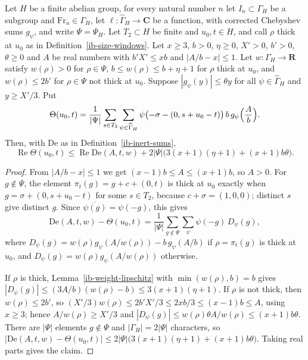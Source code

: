 \begin{lemma}\label{ib-thick-replacement}
Let $H$ be a finite abelian group, for every natural number $n$ let
$I_n\subset\Gamma_H$ be a subgroup and $\mathrm{Fr}_n\in\Gamma_H$, let
$\ell:\widehat\Gamma_H\to\mathbf C$ be a function, with corrected Chebyshev sums $g_\psi$,
and write $\Psi=\Psi_H$. Let $T_2\subset H$ be finite and $u_0,t\in H$, and call
$\rho$ thick at $u_0$ as in Definition~\ref{ib-size-windows}. Let
$x\geq3$, $b>0$, $\eta\geq0$, $X'>0$, $b'>0$, $\theta\geq0$ and $A$ be real
numbers with $b'X'\leq xb$ and $|A/b-x|\leq1$. Let $w:\Gamma_H\to\mathbf R$
satisfy $w(\rho)>0$ for $\rho\in\Psi$, $b\leq w(\rho)\leq b+\eta+1$ for $\rho$
thick at $u_0$, and $w(\rho)\leq2b'$ for $\rho\in\Psi$ not thick at $u_0$.
Suppose $|g_\psi(y)|\leq\theta y$ for all $\psi\in\widehat\Gamma_H$ and
$y\geq X'/3$. Put
\[
 \Theta(u_0,t)=\frac1{|\Psi|}\sum_{s\in T_2}\sum_{\psi\in\widehat\Gamma_H}
 \psi\bigl(-\sigma-(0,s+u_0-t)\bigr)\,b\,g_\psi\Bigl(\frac Ab\Bigr).
\]
Then, with $\mathrm{De}$ as in Definition~\ref{ib-inert-sums},
\[
 \operatorname{Re}\Theta(u_0,t)\leq\operatorname{Re}\mathrm{De}(A,t,w)
 +2|\Psi|\bigl(3(x+1)(\eta+1)+(x+1)b\theta\bigr).
\]
\end{lemma}
\begin{proof}
From $|A/b-x|\leq1$ we get $(x-1)b\leq A\leq(x+1)b$, so $A>0$. For
$g\notin\Psi$, the element $\pi_t(g)=g+c+(0,t)$ is thick at $u_0$ exactly when
$g=\sigma+(0,s+u_0-t)$ for some $s\in T_2$, because $c+\sigma=(1,0,0)$; distinct
$s$ give distinct $g$. Since $\overline{\psi(g)}=\psi(-g)$, this gives
\[
 \mathrm{De}(A,t,w)-\Theta(u_0,t)=\frac1{|\Psi|}\sum_{g\notin\Psi}\sum_\psi\psi(-g)\,D_\psi(g),
\]
where $D_\psi(g)=w(\rho)g_\psi(A/w(\rho))-b\,g_\psi(A/b)$ if $\rho=\pi_t(g)$ is
thick at $u_0$, and $D_\psi(g)=w(\rho)g_\psi(A/w(\rho))$ otherwise.

If $\rho$ is thick, Lemma~\ref{ib-weight-lipschitz} with $\min(w(\rho),b)=b$
gives $|D_\psi(g)|\leq(3A/b)(w(\rho)-b)\leq3(x+1)(\eta+1)$. If $\rho$ is not
thick, then $w(\rho)\leq2b'$, so
$(X'/3)w(\rho)\leq2b'X'/3\leq2xb/3\leq(x-1)b\leq A$, using $x\geq3$; hence
$A/w(\rho)\geq X'/3$ and $|D_\psi(g)|\leq w(\rho)\theta A/w(\rho)\leq(x+1)b\theta$.
There are $|\Psi|$ elements $g\notin\Psi$ and $|\Gamma_H|=2|\Psi|$ characters, so
$|\mathrm{De}(A,t,w)-\Theta(u_0,t)|\leq2|\Psi|\bigl(3(x+1)(\eta+1)+(x+1)b\theta\bigr)$.
Taking real parts gives the claim.
\end{proof}

